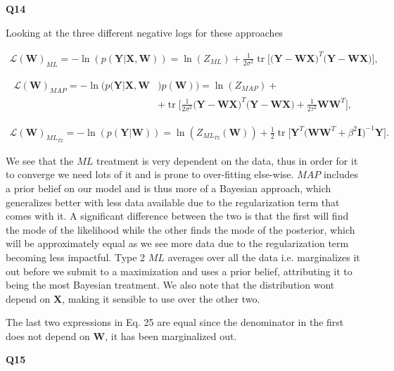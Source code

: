 \documentclass[a4paper]{article}
\DeclareMathOperator{\tr}{tr}
\begin{document}
\noindent\textbf{Q14}

\noindent\makebox[\linewidth]{\rule{\textwidth}{0.4pt}}
\hfil

\noindent Looking at the three different negative logs for these approaches

\begin{align*}
\mathcal{L}(\mathbf{W})_{ML}=-\ln(p(\mathbf{Y}\vert\mathbf{X},\mathbf{W}))=\ln(Z_{ML})+\frac{1}{2\sigma^2}\tr\bigg[\big(\mathbf{Y}-\mathbf{WX}\big)^T\big(\mathbf{Y}-\mathbf{WX}\big)\bigg],
\end{align*}

\begin{align*}
\mathcal{L}(\mathbf{W})_{MAP}=-\ln\big(p(\mathbf{Y}\vert\mathbf{X},\mathbf{W}&)p(\mathbf{W})\big)=\ln(Z_{MAP}) + \\&+\tr\bigg[\frac{1}{2\sigma^2}\big(\mathbf{Y}-\mathbf{WX}\big)^T\big(\mathbf{Y}-\mathbf{WX}\big)+\frac{1}{2\tau^2}\mathbf{WW}^T\bigg],
\end{align*}

\begin{align*}
\mathcal{L}(\mathbf{W})_{ML_{T2}}=-\ln(p(\mathbf{Y}\vert\mathbf{W}))=\ln(Z_{ML_{T2}}(\mathbf{W}))+\frac{1}{2}\tr\bigg[\mathbf{Y}^T\big(\mathbf{WW}^T+\beta^2\mathbf{I}\big)^{-1}\mathbf{Y}\bigg].
\end{align*}

\noindent We see that the $ML$ treatment is very dependent on the data, thus in order for it to converge we need lots of it and is prone to over-fitting else-wise. $MAP$ includes a prior belief on our model and is thus more of a Bayesian approach, which generalizes better with less data available due to the regularization term that comes with it. A significant difference between the two is that the first will find the mode of the likelihood while the other finds the mode of the posterior, which will be approximately equal as we see more data due to the regularization term becoming less impactful. Type 2 $ML$ averages over all the data i.e. marginalizes it out before we submit to a maximization and uses a prior belief, attributing it to being the most Bayesian treatment. We also note that the distribution wont depend on $\mathbf{X}$, making it sensible to use over the other two.

The last two expressions in Eq. 25 are equal since the denominator in the first does not depend on $\mathbf{W}$, it has been marginalized out.   

\hfil

\noindent\textbf{Q15}
\end{document}
